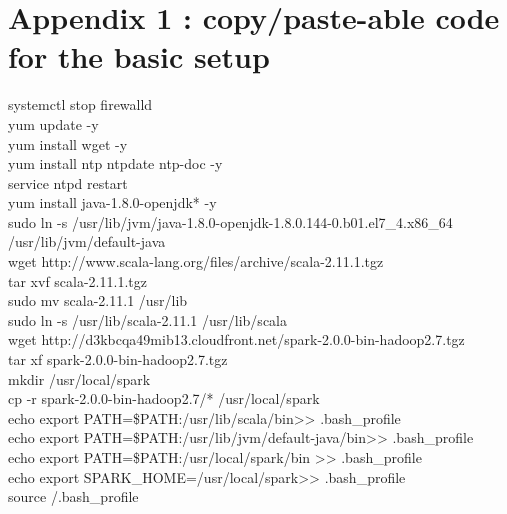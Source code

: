 \documentclass[a4paper]{article}
\begin{document}
\section{Appendix 1 : copy/paste-able code for the basic setup}
\begin{center}
\begin{tcolorbox}[width=0.8\linewidth,colframe=black!5!white]
systemctl stop firewalld
\\yum update -y
\\ yum install wget -y
\\yum install ntp ntpdate ntp-doc -y
\\service ntpd restart
\\yum install java-1.8.0-openjdk* -y
\\sudo ln -s /usr/lib/jvm/java-1.8.0-openjdk-1.8.0.144-0.b01.el7\_4.x86\_64 /usr/lib/jvm/default-java
\\wget http://www.scala-lang.org/files/archive/scala-2.11.1.tgz
\\ tar xvf scala-2.11.1.tgz
\\ sudo mv scala-2.11.1 /usr/lib
\\ sudo ln -s /usr/lib/scala-2.11.1 /usr/lib/scala
\\wget http://d3kbcqa49mib13.cloudfront.net/spark-2.0.0-bin-hadoop2.7.tgz
\\tar xf spark-2.0.0-bin-hadoop2.7.tgz
\\mkdir /usr/local/spark
\\cp -r spark-2.0.0-bin-hadoop2.7/* /usr/local/spark
\\echo \textquotesingle export PATH=\$PATH:/usr/lib/scala/bin\textquotesingle >> .bash\_profile
\\echo \textquotesingle export PATH=\$PATH:/usr/lib/jvm/default-java/bin\textquotesingle >> .bash\_profile
\\echo \textquotesingle export PATH=\$PATH:/usr/local/spark/bin \textquotesingle >> .bash\_profile
\\echo \textquotesingle export SPARK\_HOME=/usr/local/spark\textquotesingle >> .bash\_profile
\\source \texttildelow/.bash\_profile
\end{tcolorbox}
\end{center}
\end{document}
